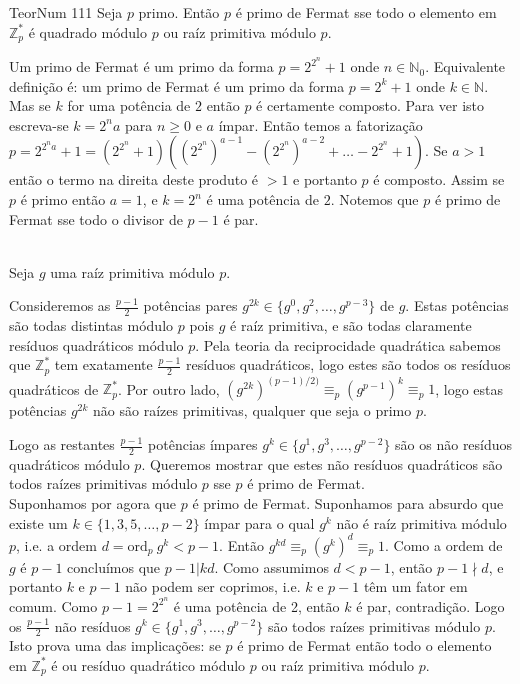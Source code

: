 \documentclass[repertorio-solutions-1.tex]{subfiles}
\renewcommand*{\ord}[1]{\ensuremath{\text{ord}_#1\:}}
\begin{document}
\begin{problem}{TeorNum 111}
Seja $p$ primo. Então $p$ é primo de Fermat sse todo o elemento
em $\mathbb{Z}_p^*$ é quadrado módulo $p$ ou raíz primitiva módulo $p$.
\end{problem}

\begin{solution}
\begin{smallnote}
Um primo de Fermat é um primo da forma $p=2^{2^n}+1$ onde $n\in\mathbb{N}_0$.
Equivalente definição é: um primo de Fermat é um primo da forma $p=2^k+1$ onde $k\in\mathbb{N}$.
Mas se $k$ for uma potência de $2$ então $p$ é certamente composto. Para ver isto escreva-se $k=2^na$ para $n\geq 0$ e $a$ ímpar.
Então temos a fatorização
$p=2^{2^na}+1=(2^{2^n}+1)((2^{2^n})^{a-1}-(2^{2^n})^{a-2}+\dots-2^{2^n}+1)$.
Se $a>1$ então o termo na direita deste produto é $>1$ e portanto $p$ é composto.
Assim se $p$ é primo então $a=1$, e $k=2^n$ é uma potência de $2$. Notemos que $p$ é primo de Fermat sse todo o divisor de $p-1$ é par.
\end{smallnote}
\\

Seja $g$ uma raíz primitiva módulo $p$.

Consideremos as $\frac{p-1}{2}$ potências pares
$g^{2k}\in\{g^0,g^2,\dots,g^{p-3}\}$ de $g$.
Estas potências são todas distintas módulo $p$ pois $g$ é raíz primitiva,
e são todas claramente resíduos quadráticos módulo $p$.
Pela teoria da reciprocidade quadrática sabemos que $\mathbb{Z}_p^*$ tem
exatamente $\frac{p-1}{2}$ resíduos quadráticos, logo estes são todos os
resíduos quadráticos de $\mathbb{Z}_p^*$. Por outro lado,
$(g^{2k})^{(p-1)/2)}\equiv_p (g^{p-1})^k\equiv_p 1$, logo estas potências
$g^{2k}$ não são raízes primitivas, qualquer que seja o primo $p$.

Logo as restantes $\frac{p-1}{2}$ potências ímpares
$g^k\in\{g^1,g^3,\dots,g^{p-2}\}$ são os não resíduos quadráticos módulo $p$.
Queremos mostrar que estes não resíduos quadráticos são todos raízes
primitivas módulo $p$ sse $p$ é primo de Fermat.
\\

Suponhamos por agora que $p$ é primo de Fermat.
Suponhamos para absurdo que existe um $k\in\{1,3,5,\dots,p-2\}$ ímpar para o
qual $g^k$ não é raíz primitiva módulo $p$, i.e. a ordem $d=\ord{p}g^k<p-1$.
Então $g^{kd}\equiv_p(g^k)^d\equiv_p 1$.
Como a ordem de $g$ é $p-1$ concluímos que $p-1|kd$.
Como assumimos $d<p-1$, então $p-1\nmid d$, e portanto $k$ e $p-1$ não
podem ser coprimos, i.e. $k$ e $p-1$ têm um fator em comum.
Como $p-1=2^{2^n}$ é uma potência de 2, então $k$ é par, contradição.
Logo os $\frac{p-1}{2}$ não resíduos $g^k\in\{g^1,g^3,\dots,g^{p-2}\}$
são todos raízes primitivas módulo $p$.
Isto prova uma das implicações: se $p$ é primo de Fermat então todo o
elemento em $\mathbb{Z}_p^*$ é ou resíduo quadrático módulo $p$ ou raíz
primitiva módulo $p$.
\\


\end{solution}
\end{document}
